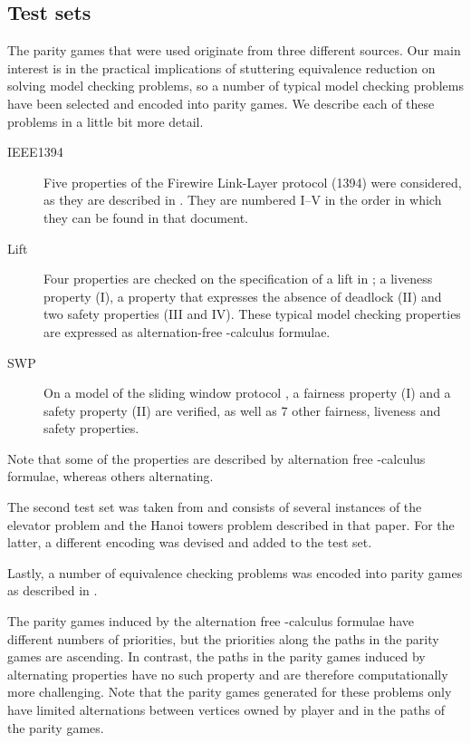 \documentclass[a4paper]{llncs}
\begin{document}
\subsection{Test sets}

The parity games that were used originate from three different sources. Our
main interest is in the practical implications of stuttering equivalence 
reduction on solving model checking problems, so a number of typical model
checking problems have been selected and encoded into parity games. We describe each of
these problems in a little bit more detail.
\begin{description}
\item[IEEE1394] Five properties of the Firewire Link-Layer protocol (1394) 
  \cite{Lut:97} were considered, as they are described in \cite{SM:98}. They are
  numbered I--V in the order in which they can be found in that document.
\item[Lift] Four properties are checked on the specification of a lift in
  \cite{GPW:03}; a liveness property (I), a property that expresses the absence
  of deadlock (II) and two safety properties (III and IV). These typical model
  checking properties are expressed as alternation-free -calculus formulae.
\item[SWP] On a model of the sliding window protocol \cite{BFGPP:05}, a 
  fairness property (I) and a safety property (II) are verified, as well as 7
  other fairness, liveness and safety properties.
\end{description}
Note that some of the properties are described by alternation free
-calculus formulae, whereas others alternating.

The second test set was taken from \cite{FL:09} and consists of several 
instances of the elevator problem and the Hanoi towers problem described in
that paper. For the latter, a different encoding was devised and added
to the test set.

Lastly, a number of equivalence checking problems was encoded into parity games
as described in \cite{CPPW:07}.

The parity games induced by the alternation free -calculus formulae
have different numbers of priorities, but the priorities along the
paths in the parity games are ascending. In contrast, the paths in the
parity games induced by alternating properties have no such property
and are therefore computationally more challenging. Note that the parity games
generated for these problems only have limited alternations between vertices
owned by player  and  in the paths of the parity games.
\end{document}
